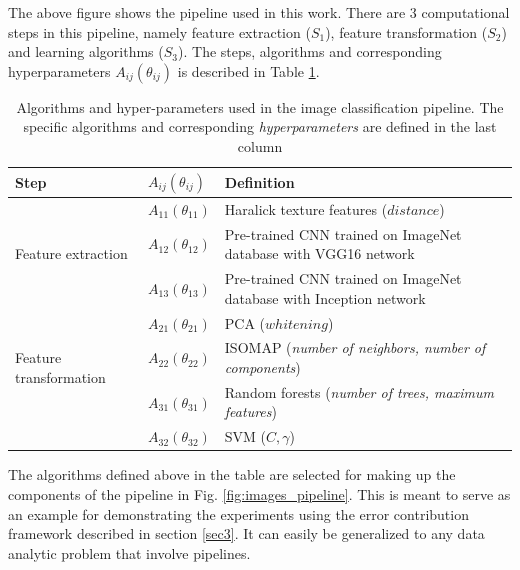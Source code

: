  The above figure shows the pipeline used in this work. There are 3 computational steps in this pipeline, namely feature extraction ($S_1$), feature transformation ($S_2$) and learning algorithms ($S_3$). The steps, algorithms and corresponding hyperparameters $A_{ij}(\theta_{ij})$ is described in Table \ref{table:algorithms_table}.

\begin{table}[H]
\centering
\caption{Algorithms and hyper-parameters used in the image classification pipeline. The specific algorithms and corresponding \textit{hyperparameters} are defined in the last column}
\begin{tabular}{@{} |m{9.7em}|m{1.5cm}|m{8cm}| @{}} 
 \hline
 Step & $A_{ij}(\theta_{ij})$ & Definition \\ 
 \hline
 \multirow{3}{*}{Feature extraction} & $A_{11}(\theta_{11})$ & Haralick texture features ($distance$) \\ 
 & $A_{12}(\theta_{12})$ & Pre-trained CNN trained on ImageNet \cite{deng2009imagenet} database with VGG16 \cite{simonyan2014very} network  \\
  & $A_{13}(\theta_{13})$ & Pre-trained CNN trained on ImageNet \cite{deng2009imagenet} database with Inception \cite{szegedy2016rethinking} network  \\
 \hline
 \multirow{3}{*}{Feature transformation} & $A_{21}(\theta_{21})$ & PCA ($whitening$) \cite{wold1987principal} \\
 & $A_{22}(\theta_{22})$ & ISOMAP (\textit{number of neighbors, number of components}) \cite{tenenbaum2000global} \\
 \hline
 \multirow{3}{*}{Learning algorithms} & $A_{31}(\theta_{31})$ & Random forests (\textit{number of trees, maximum features}) \cite{breiman2001random} \\
 & $A_{32}(\theta_{32})$ & SVM ($C, \gamma$) \cite{cortes1995support}\\
 \hline
 \end{tabular}
 \label{table:algorithms_table}
\end{table}
The algorithms defined above in the table are selected for making up the components of the pipeline in Fig. \ref{fig:images_pipeline}. This is meant to serve as an example for demonstrating the experiments using the error contribution framework described in section \ref{sec3}. It can easily be generalized to any data analytic problem that involve pipelines. 

